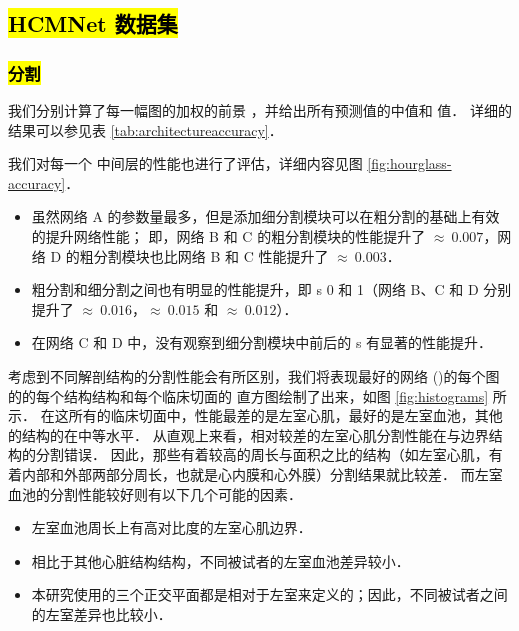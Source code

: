 \subsection{\hl{HCMNet 数据集}}



\subsubsection{\hl{分割}}

我们分别计算了每一幅图的加权的前景 \IoU{}，并给出所有预测值的中值和 \IQR{} 值．
详细的结果可以参见表 \ref{tab:architectureaccuracy}．



我们对每一个 \UNet{} 中间层的性能也进行了评估，详细内容见图 \ref{fig:hourglass-accuracy}．

\begin{itemize}
\item 虽然网络 A 的参数量最多，但是添加细分割模块可以在粗分割的基础上有效的提升网络性能；
即，网络 B 和 C 的粗分割模块的性能提升了 $\approx~0.007$，网络 D 的粗分割模块也比网络 B 和 C 性能提升了 $\approx~0.003$．
\item 粗分割和细分割之间也有明显的性能提升，即 \UNet{}s 0 和 1（网络 B、C 和 D 分别提升了 $\approx~0.016$，$\approx~0.015$ 和 $\approx~0.012$）．
\item 在网络 C 和 D 中，没有观察到细分割模块中前后的 \UNet{}s 有显著的性能提升．
\end{itemize}



考虑到不同解剖结构的分割性能会有所区别，我们将表现最好的网络 (\bestnetwork{})的每个图的的每个结构结构和每个临床切面的 \IoU{} 直方图绘制了出来，如图 \ref{fig:histograms} 所示．
在这所有的临床切面中，性能最差的是左室心肌，最好的是左室血池，其他的结构的在中等水平．
从直观上来看，相对较差的左室心肌分割性能在与边界结构的分割错误．
因此，那些有着较高的周长与面积之比的结构（如左室心肌，有着内部和外部两部分周长，也就是心内膜和心外膜）分割结果就比较差．
而左室血池的分割性能较好则有以下几个可能的因素．

\begin{itemize}
\item 左室血池周长上有高对比度的左室心肌边界．
\item 相比于其他心脏结构结构，不同被试者的左室血池差异较小．
\item 本研究使用的三个正交平面都是相对于左室来定义的；因此，不同被试者之间的左室差异也比较小．
\end{itemize}

